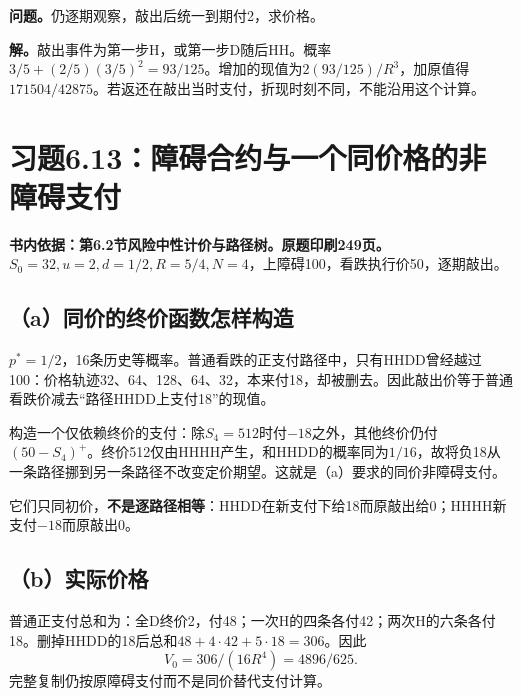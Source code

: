 \documentclass[11pt,a4paper,UTF8,fontset=fandol]{ctexart}
\begin{document}
\textbf{问题。}仍逐期观察，敲出后统一到期付2，求价格。

\textbf{解。}敲出事件为第一步H，或第一步D随后HH。概率\(3/5+(2/5)(3/5)^2=93/125\)。增加的现值为\(2(93/125)/R^3\)，加原值得\(\boxed{171504/42875}\)。若返还在敲出当时支付，折现时刻不同，不能沿用这个计算。

\bigskip

\section{习题6.13：障碍合约与一个同价格的非障碍支付}\label{ux4e60ux98986.13ux969cux788dux5408ux7ea6ux4e0eux4e00ux4e2aux540cux4ef7ux683cux7684ux975eux969cux788dux652fux4ed8}

\textbf{书内依据：第6.2节风险中性计价与路径树。原题印刷249页。}\(S_0=32,u=2,d=1/2,R=5/4,N=4\)，上障碍100，看跌执行价50，逐期敲出。

\subsection{（a）同价的终价函数怎样构造}\label{aux540cux4ef7ux7684ux7ec8ux4ef7ux51fdux6570ux600eux6837ux6784ux9020}

\(p^*=1/2\)，16条历史等概率。普通看跌的正支付路径中，只有HHDD曾经越过100：价格轨迹32、64、128、64、32，本来付18，却被删去。因此敲出价等于普通看跌价减去``路径HHDD上支付18''的现值。

构造一个仅依赖终价的支付：除\(S_4=512\)时付\(-18\)之外，其他终价仍付\((50-S_4)^+\)。终价512仅由HHHH产生，和HHDD的概率同为\(1/16\)，故将负18从一条路径挪到另一条路径不改变定价期望。这就是（a）要求的同价非障碍支付。

它们只同初价，\textbf{不是逐路径相等}：HHDD在新支付下给18而原敲出给0；HHHH新支付\(-18\)而原敲出0。

\subsection{（b）实际价格}\label{bux5b9eux9645ux4ef7ux683c}

普通正支付总和为：全D终价2，付48；一次H的四条各付42；两次H的六条各付18。删掉HHDD的18后总和\(48+4\cdot42+5\cdot18=306\)。因此
\[\boxed{V_0=306/(16R^4)=4896/625.}\]
完整复制仍按原障碍支付而不是同价替代支付计算。

\begingroup
\small
\setlength{\tabcolsep}{4pt}
\renewcommand{\arraystretch}{1.10}
\end{document}
